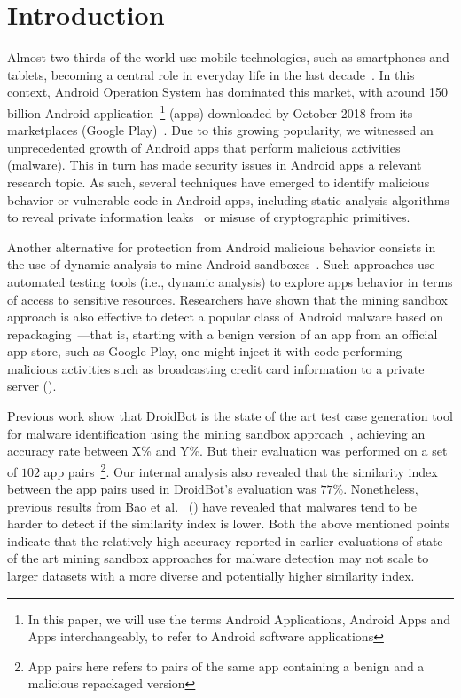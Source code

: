 \section{Introduction}\label{sec:introduction}

Almost two-thirds of the world use mobile technologies, such as smartphones and tablets, becoming a central role in everyday life in the last decade~\cite{Comscore,DBLP:journals/tse/MartinSJZH17}. In this context, Android Operation System has dominated this market, with around 150 billion Android application~\footnote{In this paper, we will use the terms Android Applications, Android Apps and Apps interchangeably, to refer to Android software applications} (apps) downloaded by October 2018  from its marketplaces (Google Play)~\cite{Statista}. Due to this growing popularity, we witnessed an unprecedented growth of  Android apps that perform malicious activities (malware).  This in turn has made security issues in Android apps a relevant research topic. As such, several techniques have emerged to identify malicious behavior or vulnerable code in Android apps, including static analysis algorithms to reveal private information leaks~\cite{DBLP:conf/pldi/ArztRFBBKTOM14} or misuse of 
cryptographic primitives.~\cite{DBLP:journals/tse/KrugerSABM21}

Another alternative for protection from Android malicious behavior consists in the use of dynamic analysis to mine Android sandboxes~\cite{DBLP:conf/icse/JamrozikSZ16}. Such approaches use automated testing tools (i.e., dynamic analysis) to explore apps behavior in terms of access to sensitive resources. Researchers have shown that the mining sandbox approach is also effective to detect a popular class of Android malware based on repackaging~\cite{DBLP:conf/wcre/BaoLL18,le2018towards}---that is, starting with a benign version of an app from an official app store, such as Google Play, one might inject it with code performing malicious activities such as broadcasting credit card information to a private server ().

Previous work show that DroidBot is the state of the art test case generation tool for malware identification using the mining sandbox approach~\cite{le2018towards,DBLP:journals/jss/CostaMMSSBNR22}, achieving an accuracy rate between X\% and Y\%. But their evaluation was performed on a set of $102$ app pairs~\footnote{App pairs here refers to pairs of the same app containing a benign and a malicious repackaged version}. Our internal analysis also revealed that the similarity index between the app pairs used in DroidBot's evaluation was $77\%$. Nonetheless, previous results from Bao et al.~\cite{DBLP:conf/wcre/BaoLL18} () have revealed that malwares tend to be harder to detect if the similarity index is lower. Both the above mentioned points indicate that the relatively high accuracy reported in earlier evaluations of state of the art mining sandbox approaches for malware detection may not scale to larger datasets with a more diverse and potentially higher similarity index.

